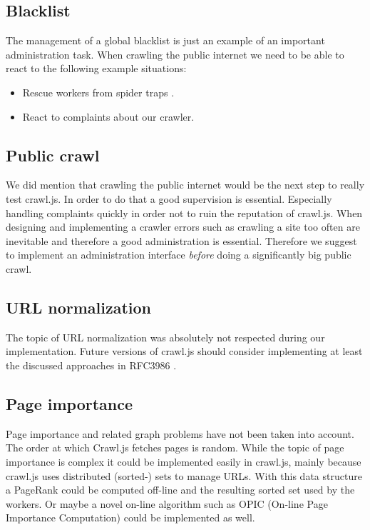 \subsection{Blacklist}
The management of a global blacklist is just an example of an important administration task. When crawling the public internet we need to be able to react to the following example situations:
\begin{itemize}
  \item Rescue workers from spider traps \cite{wiki:spider_trap}.
  \item React to complaints about our crawler.
\end{itemize}

\subsection{Public crawl}
We did mention that crawling the public internet would be the next step to really test crawl.js. In order to do that a good supervision is essential. Especially handling complaints quickly in order not to ruin the reputation of crawl.js. When designing and implementing a crawler errors such as crawling a site too often are inevitable and therefore a good administration is essential. Therefore we suggest to implement an administration interface \emph{before} doing a significantly big public crawl.

\subsection{URL normalization}
The topic of URL normalization \cite{wiki:url_normalization} was absolutely not respected during our implementation. Future versions of crawl.js should consider implementing at least the discussed approaches in RFC3986 \cite{rfc:url_normalization}.

\subsection{Page importance}
Page importance and related graph problems have not been taken into account. The order at which Crawl.js fetches pages is random. While the topic of page importance is complex it could be implemented easily in crawl.js, mainly because crawl.js uses distributed (sorted-) sets to manage URLs. With this data structure a PageRank\cite{google} could be computed off-line and the resulting sorted set used by the workers. Or maybe a novel on-line algorithm such as OPIC (On-line Page Importance Computation) \cite{page_importance1} could be implemented as well.
